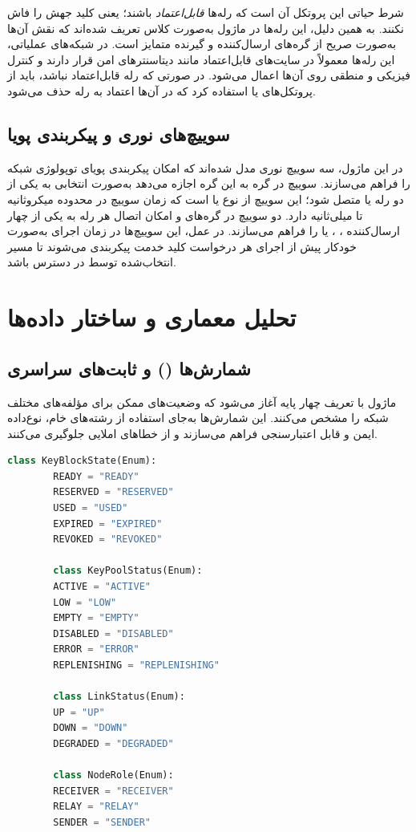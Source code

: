 شرط حیاتی این پروتکل آن است که رله‌ها \emph{قابل‌اعتماد} باشند؛ یعنی کلید جهش را فاش نکنند. به همین دلیل، این رله‌ها در ماژول به‌صورت کلاس  تعریف شده‌اند که نقش آن‌ها به‌صورت صریح از گره‌های ارسال‌کننده و گیرنده متمایز است. در شبکه‌های عملیاتی، این رله‌ها معمولاً در سایت‌های قابل‌اعتماد مانند دیتاسنترهای امن قرار دارند و کنترل فیزیکی و منطقی روی آن‌ها اعمال می‌شود. در صورتی که رله قابل‌اعتماد نباشد، باید از پروتکل‌های  یا  استفاده کرد که در آن‌ها اعتماد به رله حذف می‌شود.

\subsection{سوییچ‌های نوری و پیکربندی پویا}

در این ماژول، سه سوییچ نوری مدل شده‌اند که امکان پیکربندی پویای توپولوژی شبکه را فراهم می‌سازند. سوییچ  در گره  به این گره اجازه می‌دهد به‌صورت انتخابی به یکی از دو رله  یا  متصل شود؛ این سوییچ از نوع  یا  است که زمان سوییچ در محدوده میکروثانیه تا میلی‌ثانیه دارد. دو سوییچ  در گره‌های  و  امکان اتصال هر رله به یکی از چهار ارسال‌کننده ، ،  یا  را فراهم می‌سازند. در عمل، این سوییچ‌ها در زمان اجرای  به‌صورت خودکار پیش از اجرای هر درخواست کلید خدمت پیکربندی می‌شوند تا مسیر انتخاب‌شده توسط  در دسترس باشد.

\section{تحلیل معماری و ساختار داده‌ها}

\subsection{شمارش‌ها () و ثابت‌های سراسری}

ماژول با تعریف چهار  پایه آغاز می‌شود که وضعیت‌های ممکن برای مؤلفه‌های مختلف شبکه را مشخص می‌کنند. این شمارش‌ها به‌جای استفاده از رشته‌های خام، نوع‌داده ایمن و قابل اعتبارسنجی فراهم می‌سازند و از خطاهای املایی جلوگیری می‌کنند.

\begin{LTR}
	\begin{lstlisting}[language=Python]
		class KeyBlockState(Enum):
		READY = "READY"
		RESERVED = "RESERVED"
		USED = "USED"
		EXPIRED = "EXPIRED"
		REVOKED = "REVOKED"
		
		class KeyPoolStatus(Enum):
		ACTIVE = "ACTIVE"
		LOW = "LOW"
		EMPTY = "EMPTY"
		DISABLED = "DISABLED"
		ERROR = "ERROR"
		REPLENISHING = "REPLENISHING"
		
		class LinkStatus(Enum):
		UP = "UP"
		DOWN = "DOWN"
		DEGRADED = "DEGRADED"
		
		class NodeRole(Enum):
		RECEIVER = "RECEIVER"
		RELAY = "RELAY"
		SENDER = "SENDER"
	\end{lstlisting}
\end{LTR}

